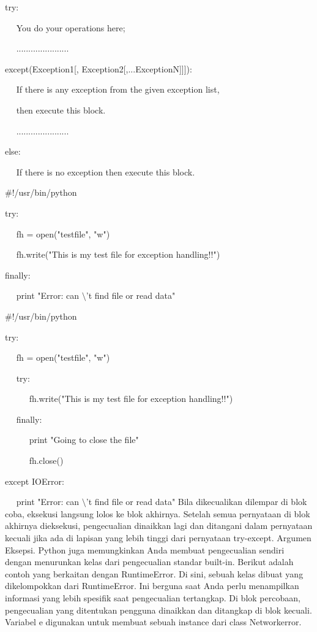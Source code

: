 \vspace{10pt}
\vspace{12pt}

try: 
 
~~ You do your operations here; 

~~ ...................... 
 
except(Exception1[, Exception2[,...ExceptionN]]]): 
 
~~ If there is any exception from the given exception list,  

~~ then execute this block. 

~~ ...................... 

else: 
 
~~ If there is no exception then execute this block.  
\vspace{12pt}
\vspace{12pt}
 
 $  \#  $!/usr/bin/python 
\vspace{12pt}

try: 
 
~~ fh = open("testfile", "w") 

~~ fh.write("This is my test file for exception handling!!") 

finally: 

~~ print "Error: can $  \setminus  $'t find file or read data" 
\vspace{12pt}
\vspace{12pt}
 
 $  \#  $!/usr/bin/python 
\vspace{12pt}
 
try: 
 
~~ fh = open("testfile", "w") 

~~ try: 
 
~~~~~ fh.write("This is my test file for exception handling!!") 

~~ finally: 
 
~~~~~ print "Going to close the file" 

~~~~~ fh.close() 

except IOError: 
 
~~ print "Error: can $  \setminus  $'t find file or read data" 
\vspace{12pt}
\vspace{12pt}
\vspace{12pt}
\vspace{12pt}
Bila dikecualikan dilempar di blok coba, eksekusi langsung lolos ke blok akhirnya. Setelah semua pernyataan di blok akhirnya dieksekusi, pengecualian dinaikkan lagi dan ditangani dalam pernyataan kecuali jika ada di lapisan yang lebih tinggi dari pernyataan try-except. Argumen Eksepsi. Python juga memungkinkan Anda membuat pengecualian sendiri dengan menurunkan kelas dari pengecualian standar built-in. Berikut adalah contoh yang berkaitan dengan RuntimeError. Di sini, sebuah kelas dibuat yang dikelompokkan dari RuntimeError. Ini berguna saat Anda perlu menampilkan informasi yang lebih spesifik saat pengecualian tertangkap. Di blok percobaan, pengecualian yang ditentukan pengguna dinaikkan dan ditangkap di blok kecuali. Variabel e digunakan untuk membuat sebuah instance dari class Networkerror. 
\vspace{18pt}

